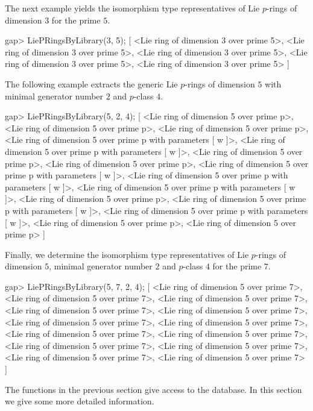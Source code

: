 The next example yields the isomorphism type representatives of Lie 
$p$-rings of dimension $3$ for the prime $5$.

\beginexample
gap> LiePRingsByLibrary(3, 5);
[ <Lie ring of dimension 3 over prime 5>, 
  <Lie ring of dimension 3 over prime 5>, 
  <Lie ring of dimension 3 over prime 5>, 
  <Lie ring of dimension 3 over prime 5>, 
  <Lie ring of dimension 3 over prime 5> ]
\endexample

The following example extracts the generic Lie $p$-rings of dimension
$5$ with minimal generator number $2$ and $p$-class $4$.

\beginexample
gap> LiePRingsByLibrary(5, 2, 4);
[ <Lie ring of dimension 5 over prime p>, 
  <Lie ring of dimension 5 over prime p>, 
  <Lie ring of dimension 5 over prime p>, 
  <Lie ring of dimension 5 over prime p with parameters [ w ]>, 
  <Lie ring of dimension 5 over prime p with parameters [ w ]>, 
  <Lie ring of dimension 5 over prime p>, 
  <Lie ring of dimension 5 over prime p>, 
  <Lie ring of dimension 5 over prime p with parameters [ w ]>, 
  <Lie ring of dimension 5 over prime p with parameters [ w ]>, 
  <Lie ring of dimension 5 over prime p with parameters [ w ]>, 
  <Lie ring of dimension 5 over prime p>, 
  <Lie ring of dimension 5 over prime p with parameters [ w ]>, 
  <Lie ring of dimension 5 over prime p with parameters [ w ]>, 
  <Lie ring of dimension 5 over prime p>, 
  <Lie ring of dimension 5 over prime p> ]
\endexample

Finally, we determine the isomorphism type representatives of Lie
$p$-rings of dimension $5$, minimal generator number $2$ and $p$-class
$4$ for the prime $7$.

\beginexample
gap> LiePRingsByLibrary(5, 7, 2, 4);
[ <Lie ring of dimension 5 over prime 7>, 
  <Lie ring of dimension 5 over prime 7>, 
  <Lie ring of dimension 5 over prime 7>, 
  <Lie ring of dimension 5 over prime 7>, 
  <Lie ring of dimension 5 over prime 7>, 
  <Lie ring of dimension 5 over prime 7>, 
  <Lie ring of dimension 5 over prime 7>, 
  <Lie ring of dimension 5 over prime 7>, 
  <Lie ring of dimension 5 over prime 7>, 
  <Lie ring of dimension 5 over prime 7>, 
  <Lie ring of dimension 5 over prime 7>, 
  <Lie ring of dimension 5 over prime 7>, 
  <Lie ring of dimension 5 over prime 7> ]
\endexample


The functions in the previous section give access to the database. In 
this section we give some more detailed information. 


